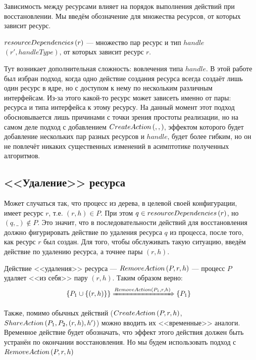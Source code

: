 Зависимость между ресурсами влияет на порядок выполнения действий при восстановлении. Мы введём обозначение для множества ресурсов, от которых зависит ресурс.

\begin{defn}
\label{def:dependsprop}
$resourceDependencies\left( r \right)$ --- множество пар ресурс и тип $handle$ $(r', handleType)$, от которых зависит ресурс $r$.
\end{defn}

Тут возникает дополнительная сложность: вовлечения типа $handle$. В этой работе был избран подход, когда одно действие
создания ресурса всегда создаёт лишь один ресурс в ядре, но с доступом к нему по нескольким различным интерфейсам.
Из-за этого какой-то ресурс может зависеть именно от пары: ресурса и типа интерфейса к этому ресурсу. На данный момент этот подход обосновывается лишь причинами с точки зрения простоты реализации, но на самом деле подход с добавлением 
$CreateAction\left( , ,  \right)$, эффектом которого будет добавление нескольких пар разных ресурсов и $handle$, будет более гибким, но он не повлечёт никаких существенных изменений в асимптотике полученных алгоритмов.

\subsection{<<Удаление>> ресурса}

Может случаться так, что процесс из дерева, в целевой своей конфигурации, имеет ресурс $r$, т.е. $(r, h) \in P$. При этом $q \in resourceDependencies\left( r \right)$, но $(q, \_) \notin P$. Это значит, что в последовательности действий для восстановления должно фигурировать действие по удаления ресурса $q$ из процесса, после того, как ресурс $r$ был создан. Для того, чтобы обслуживать такую ситуацию, введём действие по удалению ресурса, а точнее пары $(r, h)$.

\begin{defn}
\label{def:removeact}
Действие <<удаления>> ресурса --- $RemoveAction\left( P, r, h \right)$ --- процесс $P$ удаляет <<из себя>> пару $(r, h)$. Таким образом верно:
\begin{equation*}
	\left\lbrace P_1 \cup \left\lbrace (r, h) \right\rbrace \right\rbrace \xRightarrow{RemoveAction\left( P_1, r, h \right)} \left\lbrace P_1 \right\rbrace
\end{equation*}
\end{defn}

\begin{note}
Также, помимо обычных действий ($CreateAction\left( P, r, h \right)$, $ShareAction\left( P_1, P_2, (r, h), h' \right)$) можно вводить их <<временные>> аналоги. Временное действие будет обозначать, что эффект этого действия должен быть устранён по окончании восстановления. Но мы будем использовать подход с $RemoveAction\left( P, r, h \right)$
\end{note}


